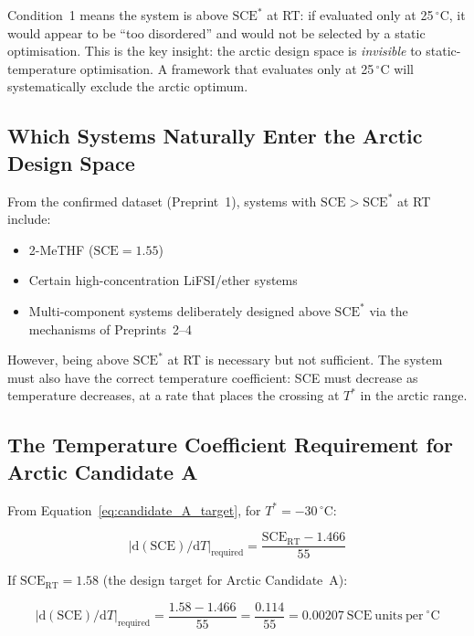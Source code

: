 \documentclass[11pt]{article}
\theoremstyle{plain}
\theoremstyle{definition}
\theoremstyle{remark}
\begin{document}
Condition~1 means the system is above $\mathrm{SCE}^{*}$ at RT:
if evaluated only at 25\,$^\circ$C, it would appear to be
``too disordered'' and would not be selected by a static optimisation.
This is the key insight: the arctic design space is \emph{invisible}
to static-temperature optimisation.  A framework that evaluates
only at 25\,$^\circ$C will systematically exclude the arctic
optimum.

\subsection{Which Systems Naturally Enter the Arctic Design Space}

From the confirmed dataset (Preprint~1), systems with
$\mathrm{SCE} > \mathrm{SCE}^{*}$ at RT include:
\begin{itemize}[leftmargin=2em]
  \item 2-MeTHF ($\mathrm{SCE} = 1.55$)
  \item Certain high-concentration LiFSI/ether systems
  \item Multi-component systems deliberately designed above
        $\mathrm{SCE}^{*}$ via the mechanisms of Preprints~2--4
\end{itemize}

However, being above $\mathrm{SCE}^{*}$ at RT is necessary but
not sufficient.  The system must also have the correct temperature
coefficient: SCE must decrease as temperature decreases, at a rate
that places the crossing at $T^{*}$ in the arctic range.

\subsection{The Temperature Coefficient Requirement for Arctic Candidate A}

From Equation~\ref{eq:candidate_A_target}, for $T^{*} = -30\,^\circ$C:

\begin{equation}
  |\mathrm{d}(\mathrm{SCE})/\mathrm{d}T|_\mathrm{required} =
  \frac{\mathrm{SCE}_\mathrm{RT} - 1.466}{55}
  \label{eq:coeff_required}
\end{equation}

If $\mathrm{SCE}_\mathrm{RT} = 1.58$ (the design target for
Arctic Candidate~A):

\begin{equation}
  |\mathrm{d}(\mathrm{SCE})/\mathrm{d}T|_\mathrm{required} =
  \frac{1.58 - 1.466}{55} = \frac{0.114}{55} =
  0.00207~\mathrm{SCE~units~per~}^\circ\mathrm{C}
  \label{eq:coeff_value}
\end{equation}
\end{document}
